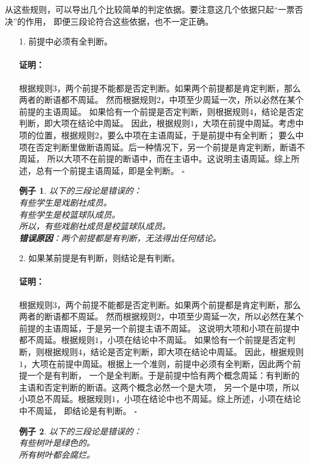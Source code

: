 \documentclass[12pt,UTF8]{ctexbook}
\newtheorem*{ex*}{例子}
\renewenvironment{proof}{\paragraph{\textbf{证明：}}}{\hfill$\square$}
\begin{document}
从这些规则，可以导出几个比较简单的判定依据。要注意这几个依据只起“一票否决”的作用，
即便三段论符合这些依据，也不一定正确。
\begin{enumerate}
    \item[1.] 前提中必须有全判断。
    \begin{proof}
        根据规则$3$，两个前提不能都是否定判断。如果两个前提都是肯定判断，那么两者的断语都不周延。
        然而根据规则$2$，中项至少周延一次，所以必然在某个前提的主语周延。
        如果恰有一个前提是否定判断，则根据规则$4$，结论是否定判断，即大项在结论中周延。
        因此，根据规则$1$，大项在前提中周延。考虑中项的位置，根据规则$2$，要么中项在主语周延，于是前提中有全判断；
        要么中项在否定判断里做断语周延。后一种情况下，另一个前提是肯定判断，断语不周延，
        所以大项不在前提的断语中，而在主语中。这说明主语周延。综上所述，总有一个前提主语周延，即是全判断。
    \end{proof}
    \begin{ex*}
        以下的三段论是错误的： \\
        \indent 有些学生是戏剧社成员。\\
        \indent 有些学生是校篮球队成员。\\
        \indent 所以，有些戏剧社成员是校篮球队成员。\\
        \textbf{错误原因}：两个前提都是有判断，无法得出任何结论。
    \end{ex*}
    \item[2.] 如果某前提是有判断，则结论是有判断。
    \begin{proof}
        根据规则$3$，两个前提不能都是否定判断。如果两个前提都是肯定判断，那么两者的断语都不周延。
        然而根据规则$2$，中项至少周延一次，所以必然在某个前提的主语周延，于是另一个前提主语不周延。
        这说明大项和小项在前提中都不周延。根据规则$1$，小项在结论中不周延。
        如果恰有一个前提是否定判断，则根据规则$4$，结论是否定判断，即大项在结论中周延。
        因此，根据规则$1$，大项在前提中周延。根据上一个准则，前提中必须有全判断，因此两个前提一个是有判断，
        一个是全判断。于是前提中恰有两个概念周延：有判断的主语和否定判断的断语。这两个概念必然一个是大项，
        另一个是中项，所以小项总不周延。根据规则$1$，小项在结论中也不周延。综上所述，小项在结论中不周延，
        即结论是有判断。
    \end{proof}
    \begin{ex*}
        以下的三段论是错误的： \\
        \indent 有些树叶是绿色的。\\
        \indent 所有树叶都会腐烂。\\

\end{ex*}
\end{enumerate}
\end{document}
